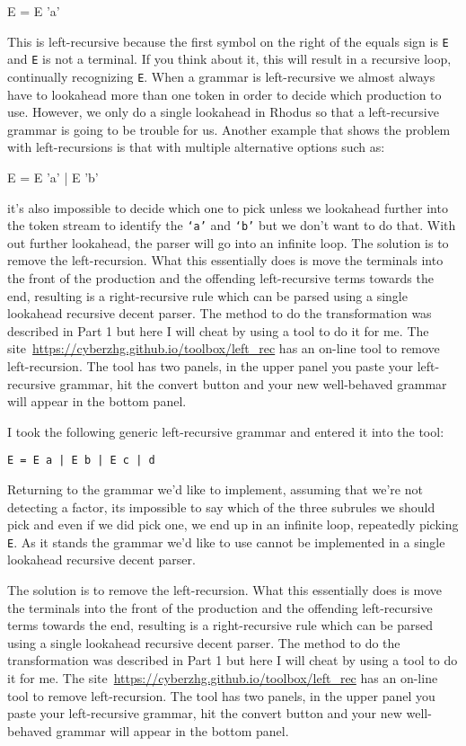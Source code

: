 \begin{small}
\begin{code}
E = E 'a'
\end{code}
\end{small}
%
This is left-recursive because the first symbol on the right of the equals sign is {\tt E} and {\tt E} is not a terminal. If you think about it, this will result in a recursive loop, continually recognizing {\tt E}. When a grammar is left-recursive we almost always have to lookahead more than one token in order to decide which production to use. However, we only do a single lookahead in Rhodus so that a left-recursive grammar is going to be trouble for us. Another example that shows the problem with left-recursions is that with multiple alternative options such as:
%
\begin{small}
\begin{code}
E  = E 'a'
   | E 'b'
\end{code}
\end{small}
%
it's also impossible to decide which one to pick unless we lookahead further into the token stream to identify the {\tt `a'} and {\tt `b'} but we don't want to do that. With out further lookahead, the parser will go into an infinite loop. The solution is to remove the left-recursion. What this essentially does is move the terminals into the front of the production and the offending left-recursive terms towards the end, resulting is a right-recursive rule which can be parsed using a single lookahead recursive decent parser. The method to do the transformation was described in Part 1 but here I will cheat by using a tool to do it for me. The site~\url{https://cyberzhg.github.io/toolbox/left_rec} has an on-line tool to remove left-recursion. The tool has two panels, in the upper panel you paste your left-recursive grammar, hit the convert button and your new well-behaved grammar will appear in the bottom panel.

I took the following generic left-recursive grammar and entered it into the tool:

{\tt  E = E a | E b | E c | d}

Returning to the grammar we'd like to implement, assuming that we're not detecting a factor, its impossible to say which of the three subrules we should pick and even if we did pick one, we end up in an infinite loop, repeatedly picking {\tt E}. As it stands the grammar we'd like to use cannot be implemented in a single lookahead recursive decent parser.

The solution is to remove the left-recursion. What this essentially does is move the terminals into the front of the production and the offending left-recursive terms towards the end, resulting is a right-recursive rule which can be parsed using a single lookahead recursive decent parser. The method to do the transformation was described in Part 1 but here I will cheat by using a tool to do it for me. The site~\url{https://cyberzhg.github.io/toolbox/left_rec} has an on-line tool to remove left-recursion. The tool has two panels, in the upper panel you paste your left-recursive grammar, hit the convert button and your new well-behaved grammar will appear in the bottom panel.

